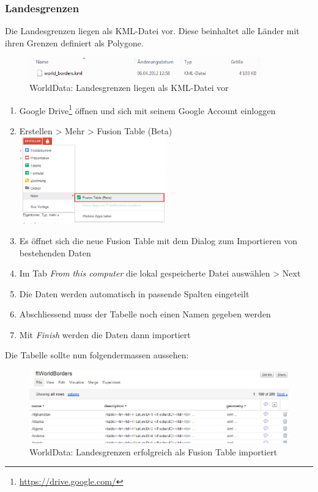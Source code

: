 \subsubsection{Landesgrenzen}
\label{landesgrenzen}
Die Landesgrenzen liegen als \gls{KML}-Datei vor. Diese beinhaltet alle Länder mit ihren Grenzen definiert als Polygone.

\begin{figure}[H]
	\centering
	\includegraphics[width=0.9\textwidth]{images/usecase1-worlddata/documentation/worlddata-worldborders_kml}
	\caption{WorldData: Landesgrenzen liegen als KML-Datei vor}
	\label{worlddata-worldborders_kml}
\end{figure}

\begin{enumerate}
\item Google Drive\footnote{\url{https://drive.google.com/}} öffnen und sich mit seinem Google Account einloggen
\item Erstellen > Mehr > Fusion Table (Beta) \\ \includegraphics[width=0.5\textwidth]{images/usecase1-worlddata/documentation/worlddata-worldborders_import1}
\item Es öffnet sich die neue Fusion Table mit dem Dialog zum Importieren von bestehenden Daten
\item Im Tab \emph{From this computer} die lokal gespeicherte Datei auswählen > Next
\item Die Daten werden automatisch in passende Spalten eingeteilt
\item Abschliessend muss der Tabelle noch einen Namen gegeben werden
\item Mit \emph{Finish} werden die Daten dann importiert
\end{enumerate}

Die Tabelle sollte nun folgendermassen aussehen:

\begin{figure}[H]
	\centering
	\includegraphics[width=\textwidth]{images/usecase1-worlddata/documentation/worlddata-worldborders_import_done}
	\caption{WorldData: Landesgrenzen erfolgreich als Fusion Table importiert}
	\label{worlddata-worldborders_import_done}
\end{figure}

